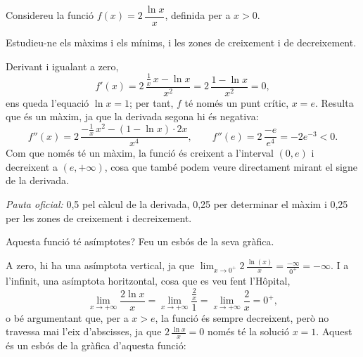 Considereu la funció $f(x)=2\,\dfrac{\ln x}{x}$, definida per a $x>0$.

\begin{apartats}

Estudieu-ne els màxims i els mínims, i les zones de creixement i de decreixement.

\begin{solucio}
Derivant i igualant a zero,
\[
f'(x)=2\,\frac{\frac1x\,x-\ln x}{x^2}=2\,\frac{1-\ln x}{x^2}=0,
\]
ens queda l'equació $\ln x=1$; per tant, $f$ té només un punt crític, $x=e$. Resulta que és un màxim, ja que la
derivada segona hi és negativa:
\[
f''(x)=2\,\frac{-\frac1x\,x^2-(1-\ln x)\cdot2x}{x^4},\qquad f''(e)=2\,\frac{-e}{e^4}=-2e^{-3}<0 .
\]
Com que només té un màxim, la funció és creixent a l'interval $(0,e)$ i decreixent a $(e,+\infty)$, cosa que
també podem veure directament mirant el signe de la derivada.

\textit{Pauta oficial:} 0,5 pel càlcul de la derivada, 0,25 per determinar el màxim i 0,25 per les zones de
creixement i decreixement.
\end{solucio}

Aquesta funció té asímptotes? Feu un esbós de la seva gràfica.

\begin{solucio}
A zero, hi ha una asímptota vertical, ja que $\lim_{x\to0^+}2\,\frac{\ln(x)}{x}=\frac{-\infty}{0^+}=-\infty$. I a
l'infinit, una asímptota horitzontal, cosa que es veu fent l'Hôpital,
\[
\lim_{x\to+\infty}\frac{2\ln x}{x}=\lim_{x\to+\infty}\frac{\frac2x}{1}=\lim_{x\to+\infty}\frac2x=0^+,
\]
o bé argumentant que, per a $x>e$, la funció és sempre decreixent, però no travessa mai l'eix d'abscisses, ja
que $2\,\frac{\ln x}{x}=0$ només té la solució $x=1$. Aquest és un esbós de la gràfica d'aquesta funció:
\begin{center}
\end{center}


\end{solucio}
\end{apartats}
